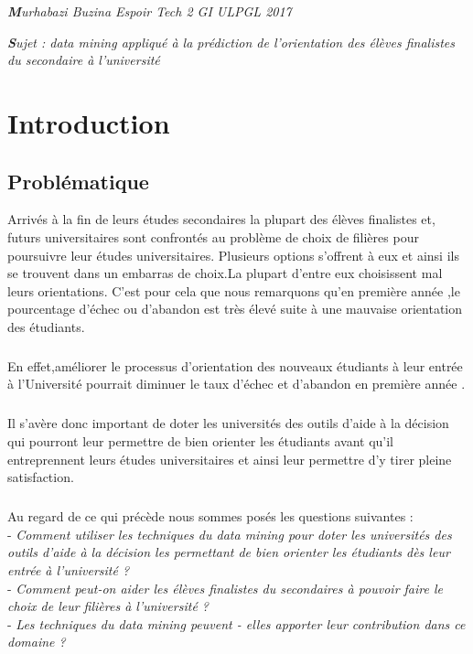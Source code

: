 \begin{center}
	\textit{ \textbf Murhabazi Buzina Espoir Tech 2 GI ULPGL 2017}
\end{center}
\begin{center}
	 \textit{ \textbf Sujet : data mining appliqué à la prédiction de l'\textbf{}orientation des élèves finalistes du secondaire à l'université }
\end{center}
\chapter*{Introduction}
\section{Problématique}
Arrivés à la fin de leurs études secondaires la plupart des élèves finalistes et, futurs universitaires sont confrontés au problème de choix de filières pour poursuivre leur études universitaires.
Plusieurs options s'offrent à eux et ainsi ils se trouvent dans un embarras de choix.La plupart d'entre eux choisissent mal leurs orientations.
C'est pour cela que nous remarquons qu'en première année ,le pourcentage d'échec ou d'abandon est très élevé suite à une mauvaise orientation des étudiants.\cite{Articl1Mr} 
\paragraph{}
En effet,améliorer le processus d'orientation des nouveaux étudiants à leur entrée à l'Université pourrait diminuer le taux d'échec et d'abandon en première année .
\paragraph{}
Il s'avère donc important de doter les universités des outils d'aide à la décision qui pourront leur permettre de bien orienter les étudiants avant qu'il entreprennent  leurs études universitaires et ainsi leur permettre d'y tirer pleine satisfaction.  
\paragraph{}
Au regard de ce qui précède nous sommes posés les questions suivantes : \\
- \emph{Comment utiliser les techniques  du data mining pour doter les universités des outils d'aide à la décision les permettant de bien orienter les étudiants dès leur entrée à l'université ?  }\\
- \emph{Comment peut-on aider les élèves finalistes du secondaires  à pouvoir faire le choix de leur filières à l'université ? }\\
- \emph{Les techniques du data mining peuvent - elles apporter leur contribution dans ce domaine ? }
